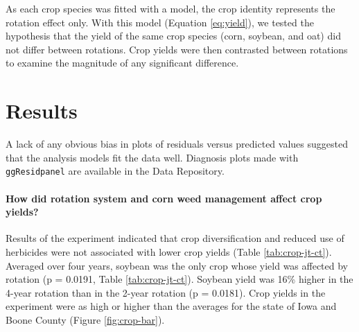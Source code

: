 \documentclass[
]{article}
\begin{document}
As each crop species was fitted with a model, the crop identity represents the rotation effect only. With this model (Equation \eqref{eq:yield}), we tested the hypothesis that the yield of the same crop species (corn, soybean, and oat) did not differ between rotations. Crop yields were then contrasted between rotations to examine the magnitude of any significant difference.

\hypertarget{results}{%
\section*{Results}\label{results}}

A lack of any obvious bias in plots of residuals versus predicted values suggested that the analysis models fit the data well. Diagnosis plots made with \texttt{ggResidpanel} \citep[version 0.3.0,][]{goodeGgResidpanelPanelsInteractive2019} are available in the Data Repository.

\hypertarget{how-did-rotation-system-and-corn-weed-management-affect-crop-yields}{%
\paragraph*{How did rotation system and corn weed management affect crop yields?}\label{how-did-rotation-system-and-corn-weed-management-affect-crop-yields}}

Results of the experiment indicated that crop diversification and reduced use of herbicides were not associated with lower crop yields (Table \ref{tab:crop-jt-ct}). Averaged over four years, soybean was the only crop whose yield was affected by rotation (p = 0.0191, Table \ref{tab:crop-jt-ct}). Soybean yield was 16\% higher in the 4-year rotation than in the 2-year rotation (p = 0.0181). Crop yields in the experiment were as high or higher than the averages for the state of Iowa and Boone County (Figure \ref{fig:crop-bar}).
\end{document}
